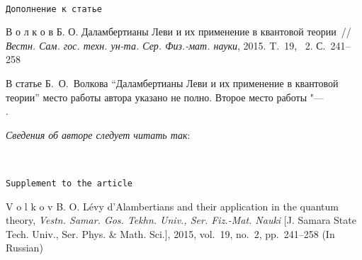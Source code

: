 \renewcommand{\baselinestretch}{0.892}
\normalfont

{

$\;$
\bigskip

\bigskip

\bigskip

\begin{center}
{\Large \texttt{Дополнение к статье}}

\end{center}



\noindent
В о л к о в Б. О. Даламбертианы Леви и их применение в квантовой теории~// \textit{Вестн.
Сам. гос. техн. ун-та. Сер. Физ.-мат. науки}, 2015. T.~19, \No~2. С.~241–258



\bigskip
\noindent
В статье Б.~О.~Волкова ``Даламбертианы Леви и их применение в квантовой теории'' место работы автора указано не полно. 
Второе место работы "---\\
{\small   {}.}

\smallskip

\noindent
\textit{Сведения об авторе следует читать так}:

{\footnotesize \noindent
{}  
}




\bigskip


\EngVestnik

$\;$
\bigskip

\bigskip

\begin{center}
{\Large \texttt{Supplement to the article}}

\end{center}

\English

\noindent
V o l k o v B. O. L\'{e}vy d'Alambertians and their application in the quantum theory, \textit{Vestn. Samar. Gos. Tekhn. Univ., Ser. Fiz.-Mat. Nauki} [J. Samara State Tech. Univ., Ser. Phys. \& Math. Sci.],
2015, vol.~19, no.~2, pp.~241–258  (In Russian)



}
